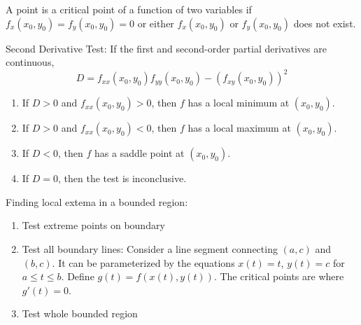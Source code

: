 \documentclass{article}
\begin{document}
A point is a critical point of a function of two variables if $f_x(x_0,y_0)=f_y(x_0,y_0)=0$ or either $f_x(x_0,y_0)$ or $f_y(x_0,y_0)$ does not exist.
\vspace{1em}

Second Derivative Test: If the first and second-order partial derivatives are continuous,
\[D=f_{xx}(x_0,y_0)f_{yy}(x_0,y_0)-{(f_{xy}(x_0,y_0))}^2\]
\begin{enumerate}
    \item If $D>0$ and $f_{xx}(x_0,y_0)>0$, then $f$ has a local minimum at $(x_0,y_0)$.
    \item If $D>0$ and $f_{xx}(x_0,y_0)<0$, then $f$ has a local maximum at $(x_0,y_0)$.
    \item If $D<0$, then $f$ has a saddle point at $(x_0,y_0)$.
    \item If $D=0$, then the test is inconclusive.
\end{enumerate}

Finding local extema in a bounded region:
\begin{enumerate}
    \item Test extreme points on boundary
    \item Test all boundary lines: Consider a line segment connecting $(a,c)$ and $(b,c)$. It can be parameterized by the equations $x(t)=t$, $y(t)=c$ for $a\leq t\leq b$. Define $g(t)=f(x(t),y(t))$. The critical points are where $g'(t)=0$.
    \item Test whole bounded region
\end{enumerate}
\end{document}
